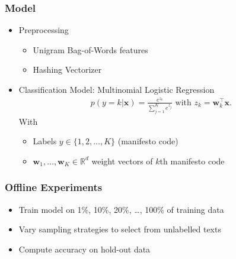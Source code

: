 \documentclass[]{beamer}
\newcommand{\R}{\ensuremath{\mathds{R}}}
\renewcommand{\vec}[1]{\mathbf{#1}}
\begin{document}
\begin{frame}\frametitle{Model}
\begin{itemize}
\item Preprocessing
\begin{itemize}
\item Unigram Bag-of-Words features
\item Hashing Vectorizer
\end{itemize}
\item Classification Model: Multinomial Logistic Regression
\begin{eqnarray}\label{eq:logreg_multiclass}
p(y=k|\vec{x}) = \frac{e^{z_k}}{\sum_{j=1}^K e^{z_j}}  \textrm{ with }  z_k=\vec{w}_k^{\top}\vec{x}.
\end{eqnarray}
With
\begin{itemize}
\item Labels $y\in\{1,2,\dots,K\}$ (manifesto code)\\ 
\item $\vec{w}_1,\dots,\vec{w}_K\in\R^{d}$ weight vectors of $k$th manifesto code\\ 
\end{itemize}
\end{itemize}
\end{frame}

\begin{frame}\frametitle{Offline Experiments}

\begin{itemize}
\item Train model on 1\%, 10\%, 20\%, \dots, 100\% of training data
\item Vary sampling strategies to select from unlabelled texts
\item Compute accuracy on hold-out data
\end{itemize}
\end{frame}
\end{document}
